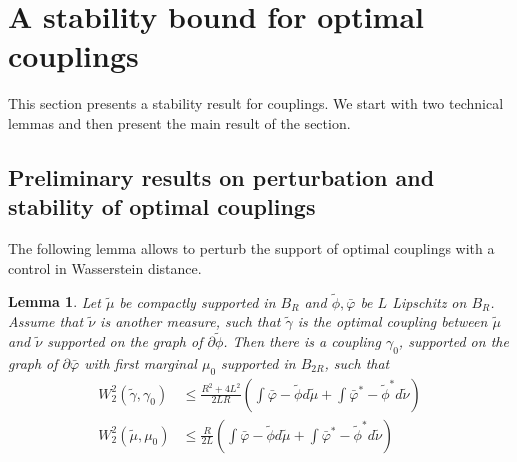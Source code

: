 \documentclass[11pt]{article}
\newtheorem{lemma}{Lemma}[section]
\newcommand{\1}{\mathbbm{1}}
\numberwithin{equation}{section}
\begin{document}
\section{A stability bound for optimal couplings}
\label{sec:stabilityCouplings}
This section presents a stability result for couplings. We start with two technical lemmas and then present the main result of the section.

\subsection{Preliminary results on perturbation and stability of optimal couplings}
The following lemma allows to perturb the support of optimal couplings with a control in Wasserstein distance.
\begin{lemma}
    Let $\tilde{\mu}$ be compactly supported in $B_R$ and $\tilde{\phi},\bar{\varphi}$ be $L$ Lipschitz on $B_R$. Assume that $\tilde{\nu}$ is another measure, such that $\tilde{\gamma}$ is the optimal coupling between $\tilde{\mu}$ and $\tilde{\nu}$ supported on the graph of $\partial\tilde{\phi}$. Then there is a coupling $\gamma_0$, supported on the graph of $\partial \bar{\varphi}$ with first marginal $\mu_0$ supported in $B_{2R}$, such that 
    \begin{align*}
        W_2^2(\tilde{\gamma}, \gamma_0) &\leq \frac{R^2 + 4L^2}{2LR} \left(\int \bar{\varphi} - \tilde{\phi} d\tilde{\mu} + \int \bar{\varphi}^* - \tilde{\phi}^* d\tilde{\nu}\right)\\
        W_2^2(\tilde{\mu}, \mu_0) &\leq \frac{R}{2L} \left(\int \bar{\varphi} - \tilde{\phi} d\tilde{\mu} + \int \bar{\varphi}^* - \tilde{\phi}^* d\tilde{\nu}\right)
    \end{align*}
    \label{lem:perturbCoulingSupport}
\end{lemma}
\end{document}

